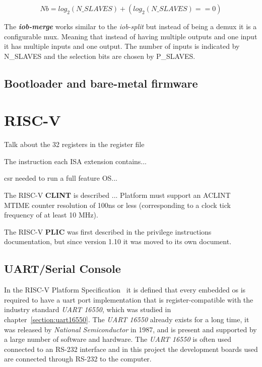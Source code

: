 \begin{equation}
    \label{eq:number_bits}
    Nb = log_2(N\_SLAVES)+(log_2(N\_SLAVES)==0)
\end{equation}

The \textbf{\textit{iob-merge}} works similar to the \textit{iob-split} but instead of being a \acrshort{demux} it is a configurable \acrfull{mux}. Meaning that instead of having multiple outputs and one input it has multiple inputs and one output. The number of inputs is indicated by N\_SLAVES and the selection bits are chosen by P\_SLAVES.

\subsection{Bootloader and bare-metal firmware}

\section{RISC-V}
\label{section:riscv}
Talk about the 32 registers in the register file

The instruction each ISA extension contains...

\acrfull{csr} needed to run a full feature OS...

The RISC-V \textbf{CLINT} is described ...
Platform must support an ACLINT MTIME counter resolution of 100ns or less (corresponding to a clock tick frequency of at least 10 MHz).

The RISC-V \textbf{PLIC} was first described in the privilege instructions documentation, but since version 1.10 it was moved to its own document.

\subsection{UART/Serial Console}
\label{section:serial_console}
In the RISC-V Platform Specification~\cite{riscv_platform_specification} it is defined that every embedded \acrfull{os} is required to have a \acrshort{uart} port implementation that is register-compatible with the industry standard \textit{UART 16550}, which was studied in chapter~\ref{section:uart16550}. The \textit{UART 16550} already exists for a long time, it was released by \textit{National Semiconductor} in 1987, and is present and supported by a large number of software and hardware. The \textit{UART 16550} is often used connected to an RS-232 interface and in this project the development boards used are connected through RS-232 to the computer.


